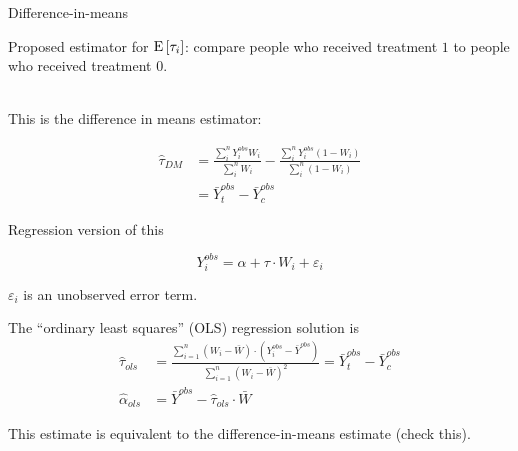 \documentclass[xcolor={dvipsnames},handout]{beamer}
\begin{document}

\begin{frame}{Difference-in-means}

Proposed estimator for ${\textrm E}\,[\tau_i]$: compare people who received treatment $1$ to people who received treatment $0$. \\~\


This is the difference in means estimator:

\begin{align*}
\hat\tau_{DM} & = \frac{\sum_i^n Y_i^{obs} W_i}{\sum_i^n W_i} - \frac{\sum_i^n Y_i^{obs} (1-W_i)}{\sum_i^n (1-W_i)}\\
& = \bar Y^{obs}_t - \bar Y^{obs}_c\nonumber
\end{align*}

\end{frame}



\begin{frame}{Regression version of this}

\[
Y_i^{obs} = \alpha + \tau \cdot W_i + \varepsilon_i
\]

$\varepsilon_i$ is an unobserved error term.

The ``ordinary least squares'' (OLS) regression solution is
\begin{align*}
\hat\tau_{ols} & = \frac{\sum_{i = 1}^n (W_i - \bar W ) \cdot (Y_i^{obs} - \bar Y^{obs}) }{\sum_{i = 1}^n (W_i - \bar W )^2} = \bar Y^{obs}_t - \bar{Y}^{obs}_c\\
\hat \alpha_{ols} & = \bar Y^{obs} - \hat \tau_{ols} \cdot \bar W
\end{align*}


This estimate is equivalent to the difference-in-means estimate (check this). 

\end{frame}
\end{document}
